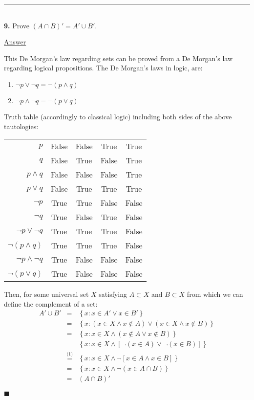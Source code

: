 \documentclass{article}[10pt]
\newenvironment{exercise}[1]
    {\noindent\rule{2cm}{0.4pt} \\
     \textbf{#1.}}
    {}
\newcommand{\answer}{

  \underline{Answer}

}
\newcommand{\qed}{

\hfill\ensuremath{\blacksquare}

}
\begin{document}
\begin{exercise}{9}
  Prove $(A \cap B)' = A' \cup B'$.
  \answer
  This De Morgan's law regarding sets can be proved
  from a De Morgan's law regarding logical propositions.
  The De Morgan's laws in logic, are:
  \begin{enumerate}[(1)]
    \item $\lnot p \lor \lnot q = \lnot (p \land q)$
    \item $\lnot p \land \lnot q = \lnot (p \lor q)$
  \end{enumerate}
  Truth table (accordingly to classical logic)
  including both sides of the above tautologies:
  \begin{center}
    \begin{tabular}{rcccc}
      $p$                     & False & False & True  & True  \\
      $q$                     & False & True  & False & True  \\
      $p \land q$             & False & False & False & True  \\
      $p \lor q$              & False & True  & True  & True  \\
      $\lnot p$               & True  & True  & False & False \\
      $\lnot q$               & True  & False & True  & False \\
      $\lnot p \lor \lnot q$  & True  & True  & True  & False \\
      $\lnot (p \land q)$     & True  & True  & True  & False \\
      $\lnot p \land \lnot q$ & True  & False & False & False \\
      $\lnot (p \lor q)$      & True  & False & False & False \\
    \end{tabular}
  \end{center}
  Then, for some universal set $X$
  satisfying $A \subset X$ and $B \subset X$
  from which we can define the complement of a set:
  \[\begin{array}{rcl}
    A' \cup B'
    &=& \left\{ x : x \in A' \lor x \in B' \right\} \\
    &=& \left\{ x : (x \in X \land x \notin A) \lor
                    (x \in X \land x \notin B)
        \right\} \\
    &=& \left\{ x : x \in X \land
                    (x \notin A \lor x \notin B)
        \right\} \\
    &=& \left\{ x : x \in X \land
                    \left[ \lnot (x \in A) \lor \lnot (x \in B) \right]
        \right\} \\
    &\stackrel{\text{(1)}}{=}&
        \left\{ x : x \in X \land
                    \lnot \left[ x \in A \land x \in B \right]
        \right\} \\
    &=& \left\{ x : x \in X \land
                    \lnot (x \in A \cap B)
        \right\} \\
    &=& (A \cap B)'
  \end{array}\]
  \qed


\end{exercise}
\end{document}
